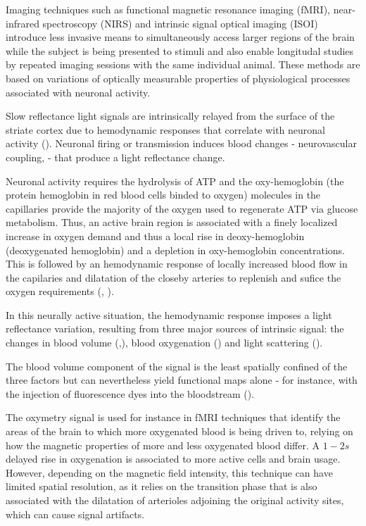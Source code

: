 Imaging techniques such as functional magnetic resonance imaging (fMRI), near-infrared spectroscopy (NIRS) and intrinsic signal optical imaging (ISOI) introduce less invasive means to simultaneously access larger regions of the brain while the subject is being presented to stimuli and also enable longitudal studies by repeated imaging sessions with the same individual animal. These methods are based on variations of optically measurable properties of physiological processes associated with neuronal activity.

Slow reflectance light signals are intrinsically relayed from the surface of the striate cortex due to hemodynamic responses that correlate with neuronal activity (\cite{Cohen1973}). Neuronal firing or transmission induces blood changes - neurovascular coupling, \cite{Villringer1995}- that produce a light reflectance change.

Neuronal activity requires the hydrolysis of ATP and the oxy-hemoglobin (the protein hemoglobin in red blood cells binded to oxygen) molecules in the capillaries provide the majority of the oxygen used to regenerate ATP via glucose metabolism. Thus, an active brain region is associated with a finely localized increase in oxygen demand and thus a local rise in deoxy-hemoglobin (deoxygenated hemoglobin) and a depletion in oxy-hemoglobin concentrations. This is followed by an hemodynamic response of locally increased blood flow in the capilaries and dilatation of the closeby arteries to replenish and sufice the oxygen requirements (\cite{Grinvald1986)}, \cite{Frostig1990}).

In this neurally active situation, the hemodynamic response imposes a light reflectance variation, resulting from three major sources of intrinsic signal: the changes in blood volume (\cite{Grinvald1986)},\cite{Frostig1990}), blood oxygenation (\cite{Vanzetta1999}) and light scattering (\cite{HillKeynes1949}).

The blood volume component of the signal is the least spatially confined of the three factors but can nevertheless yield functional maps alone - for instance, with the injection of fluorescence dyes into the bloodstream (\cite{Frostig1990}).

The oxymetry signal is used for instance in fMRI techniques that identify the areas of the brain to which more oxygenated blood is being driven to, relying on how the magnetic properties of more and less oxygenated blood differ. A $1-2s$ delayed rise in oxygenation is associated to more active cells and brain usage. However, depending on the magnetic field intensity, this technique can have limited spatial resolution, as it relies on the transition phase that is also associated with the dilatation of arterioles adjoining the original activity sites, which can cause signal artifacts.

